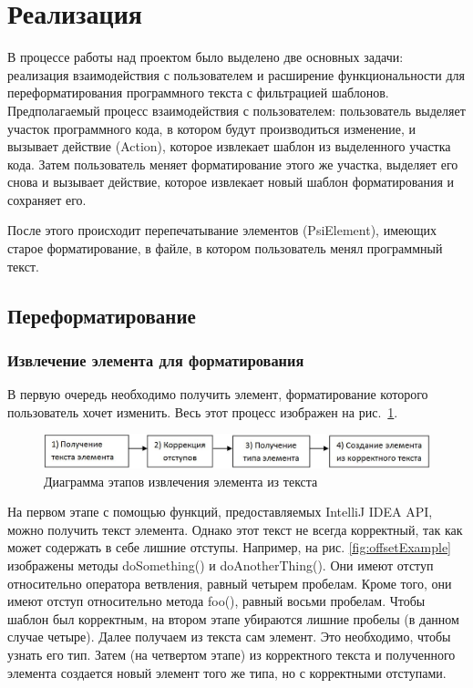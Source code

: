 \section{Реализация}
В процессе работы над проектом было выделено две основных задачи: реализация
взаимодействия с пользователем и расширение функциональности для переформатирования программного текста с фильтрацией шаблонов.
Предполагаемый процесс взаимодействия с пользователем: пользователь выделяет
участок программного кода, в котором будут производиться изменение, и вызывает 
действие (Action), которое извлекает шаблон из выделенного участка
кода. Затем пользователь меняет форматирование этого же участка, выделяет его
снова и вызывает действие, которое извлекает новый шаблон форматирования и 
сохраняет его.

После этого происходит перепечатывание элементов (PsiElement), имеющих старое
форматирование, в файле, в котором пользователь менял программный текст.

\subsection{Переформатирование}
\subsubsection{Извлечение элемента для форматирования}
В первую очередь необходимо получить элемент, форматирование которого пользователь хочет изменить.
Весь этот процесс изображен на рис.~\ref{fig:getElemDiag}.

\begin{figure}[h]
	\centering
	\includegraphics[width=\textwidth]{Ozernykh/images/getElemDiag.jpg}
	\caption{Диаграмма этапов извлечения элемента из текста}
	\label{fig:getElemDiag}
\end{figure}

На первом этапе с помощью функций, предоставляемых IntelliJ IDEA API, можно получить текст элемента. 
Однако этот текст не всегда корректный, так как может содержать в себе лишние отступы.
Например, на рис. \ref{fig:offsetExample} изображены методы doSomething() и doAnotherThing(). 
Они имеют отступ относительно оператора ветвления, равный четырем пробелам.
Кроме того, они имеют отступ относительно метода foo(), равный восьми пробелам. 
Чтобы шаблон был корректным, на втором этапе убираются лишние пробелы (в данном случае четыре).
Далее получаем из текста сам элемент. 
Это необходимо, чтобы узнать его тип. %
Затем (на четвертом этапе) из корректного текста и полученного элемента создается новый элемент того же типа, но с корректными отступами.


